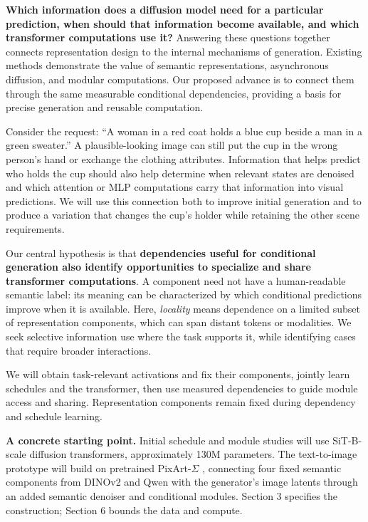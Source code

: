 \documentclass[11pt,letterpaper]{article}
\begin{document}
\textbf{Which information does a diffusion model need for a particular prediction, when should that information become available, and which transformer computations use it?} Answering these questions together connects representation design to the internal mechanisms of generation. Existing methods demonstrate the value of semantic representations, asynchronous diffusion, and modular computations. Our proposed advance is to connect them through the same measurable conditional dependencies, providing a basis for precise generation and reusable computation.

Consider the request: ``A woman in a red coat holds a blue cup beside a man in a green sweater.'' A plausible-looking image can still put the cup in the wrong person's hand or exchange the clothing attributes. Information that helps predict who holds the cup should also help determine when relevant states are denoised and which attention or MLP computations carry that information into visual predictions. We will use this connection both to improve initial generation and to produce a variation that changes the cup's holder while retaining the other scene requirements.

Our central hypothesis is that \textbf{dependencies useful for conditional generation also identify opportunities to specialize and share transformer computations}. A component need not have a human-readable semantic label: its meaning can be characterized by which conditional predictions improve when it is available. Here, \emph{locality} means dependence on a limited subset of representation components, which can span distant tokens or modalities. We seek selective information use where the task supports it, while identifying cases that require broader interactions.

We will obtain task-relevant activations and fix their components, jointly learn schedules and the transformer, then use measured dependencies to guide module access and sharing. Representation components remain fixed during dependency and schedule learning.

\textbf{A concrete starting point.} Initial schedule and module studies will use SiT-B-scale \citep{sit} diffusion transformers, approximately 130M parameters. The text-to-image prototype will build on pretrained PixArt-\(\Sigma\) \citep{pixart}, connecting four fixed semantic components from DINOv2 and Qwen with the generator's image latents through an added semantic denoiser and conditional modules. Section 3 specifies the construction; Section 6 bounds the data and compute.
\end{document}
